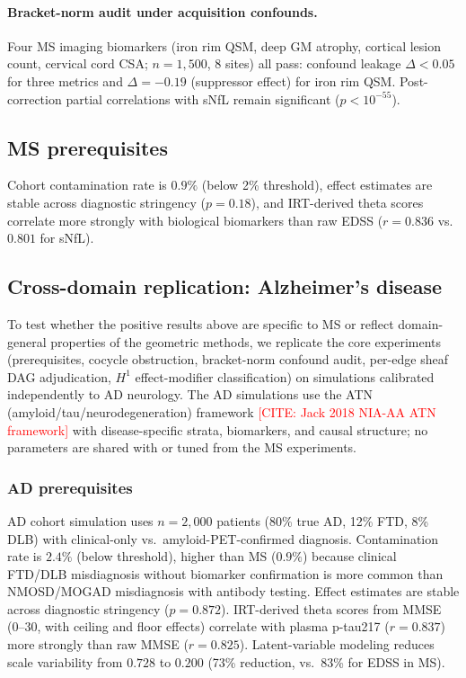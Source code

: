 \documentclass[11pt]{article}
\newcommand{\misscite}[1]{\textcolor{red}{[CITE: #1]}}
\begin{document}
\paragraph{Bracket-norm audit under acquisition confounds.}
Four MS imaging biomarkers (iron rim QSM, deep GM atrophy, cortical lesion count, cervical cord CSA; $n = 1{,}500$, 8 sites) all pass: confound leakage $\Delta < 0.05$ for three metrics and $\Delta = -0.19$ (suppressor effect) for iron rim QSM.
Post-correction partial correlations with sNfL remain significant ($p < 10^{-55}$).

\subsection{MS prerequisites}

Cohort contamination rate is $0.9\%$ (below 2\% threshold), effect estimates are stable across diagnostic stringency ($p = 0.18$), and IRT-derived theta scores correlate more strongly with biological biomarkers than raw EDSS ($r = 0.836$ vs.\ $0.801$ for sNfL).

\subsection{Cross-domain replication: Alzheimer's disease}
\label{sec:res-ad}

To test whether the positive results above are specific to MS or reflect domain-general properties of the geometric methods, we replicate the core experiments (prerequisites, cocycle obstruction, bracket-norm confound audit, per-edge sheaf DAG adjudication, $H^1$ effect-modifier classification) on simulations calibrated independently to AD neurology.
The AD simulations use the ATN (amyloid/tau/neurodegeneration) framework \misscite{Jack 2018 NIA-AA ATN framework} with disease-specific strata, biomarkers, and causal structure; no parameters are shared with or tuned from the MS experiments.

\subsubsection{AD prerequisites}

AD cohort simulation uses $n = 2{,}000$ patients (80\% true AD, 12\% FTD, 8\% DLB) with clinical-only vs.\ amyloid-PET-confirmed diagnosis.
Contamination rate is $2.4\%$ (below threshold), higher than MS ($0.9\%$) because clinical FTD/DLB misdiagnosis without biomarker confirmation is more common than NMOSD/MOGAD misdiagnosis with antibody testing.
Effect estimates are stable across diagnostic stringency ($p = 0.872$).
IRT-derived theta scores from MMSE (0--30, with ceiling and floor effects) correlate with plasma p-tau217 ($r = 0.837$) more strongly than raw MMSE ($r = 0.825$).
Latent-variable modeling reduces scale variability from $0.728$ to $0.200$ (73\% reduction, vs.\ 83\% for EDSS in MS).
\end{document}
